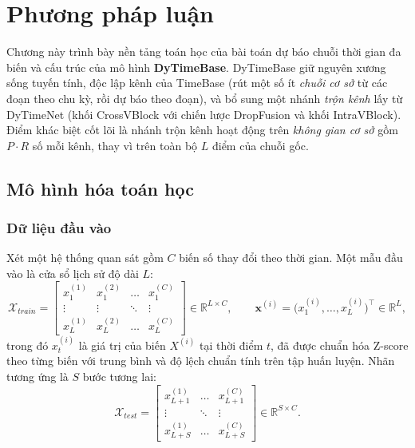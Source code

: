 \documentclass[12pt,a4paper]{report}
\numberwithin{equation}{chapter}
\newcommand{\R}{\mathbb{R}}
\begin{document}
\setcounter{chapter}{1}
\chapter{Phương pháp luận}

Chương này trình bày nền tảng toán học của bài toán dự báo chuỗi thời gian đa biến và cấu trúc của mô hình
\textbf{DyTimeBase}. DyTimeBase giữ nguyên xương sống tuyến tính, độc lập kênh của TimeBase (rút một số ít
\emph{chuỗi cơ sở} từ các đoạn theo chu kỳ, rồi dự báo theo đoạn), và bổ sung một nhánh \emph{trộn kênh} lấy từ
DyTimeNet (khối CrossVBlock với chiến lược DropFusion và khối IntraVBlock). Điểm khác biệt cốt lõi là nhánh trộn kênh
hoạt động trên \emph{không gian cơ sở} gồm $P\cdot R$ số mỗi kênh, thay vì trên toàn bộ $L$ điểm của chuỗi gốc.

\section{Mô hình hóa toán học}

\subsection{Dữ liệu đầu vào}

Xét một hệ thống quan sát gồm $C$ biến số thay đổi theo thời gian. Một mẫu đầu vào là cửa sổ lịch sử độ dài $L$:
\begin{equation}
\mathcal{X}_{train} =
\begin{bmatrix}
x^{(1)}_1 & x^{(2)}_1 & \dots & x^{(C)}_1\\
\vdots & \vdots & \ddots & \vdots\\
x^{(1)}_L & x^{(2)}_L & \dots & x^{(C)}_L
\end{bmatrix} \in \R^{L\times C},
\qquad \mathbf{x}^{(i)} = \big(x^{(i)}_1,\dots,x^{(i)}_L\big)^{\!\top}\in\R^{L},
\label{eq:input}
\end{equation}
trong đó $x^{(i)}_t$ là giá trị của biến $X^{(i)}$ tại thời điểm $t$, đã được chuẩn hóa Z-score theo từng biến với
trung bình và độ lệch chuẩn tính trên tập huấn luyện. Nhãn tương ứng là $S$ bước tương lai:
\begin{equation}
\mathcal{X}_{test} =
\begin{bmatrix}
x^{(1)}_{L+1} & \dots & x^{(C)}_{L+1}\\
\vdots & \ddots & \vdots\\
x^{(1)}_{L+S} & \dots & x^{(C)}_{L+S}
\end{bmatrix} \in \R^{S\times C}.
\label{eq:label}
\end{equation}
\end{document}
